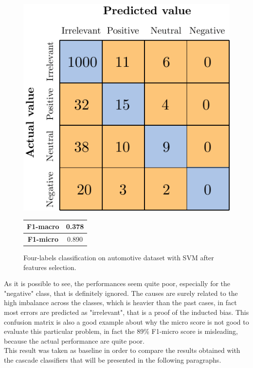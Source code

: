 \begin{figure}[H]
	\begin{minipage}[b]{0.6\linewidth}
		\centering
		\includegraphics[scale=1]{figures/conf_matrices/ita_4l_svm/ita_4l_svm_afs.pdf}
	\end{minipage}
	\begin{minipage}[b]{0.3\linewidth}
		\begin{tabular}[b]{ | c | c | } 
			\hline
			\textbf{F1-macro} & 0.378 \\
			\hline
			\textbf{F1-micro} & 0.890 \\ 
			\hline
		\end{tabular}
	\end{minipage}
	\caption{Four-labels classification on automotive dataset with SVM after features selection.}
	\label{fig:ita_4l_svm_afs}
\end{figure}



As it is possible to see, the performances seem quite poor, especially for the "negative" class, that is definitely ignored. The causes are surely related to the high imbalance across the classes, which is heavier than the past cases, in fact most errors are predicted as "irrelevant", that is a proof of the inducted bias. This confusion matrix is also a good example about why the micro score is not good to evaluate this particular problem, in fact the 89\% F1-micro score is misleading, because the actual performance are quite poor. \\
This result was taken as baseline in order to compare the results obtained with the cascade classifiers that will be presented in the following paragraphs.


